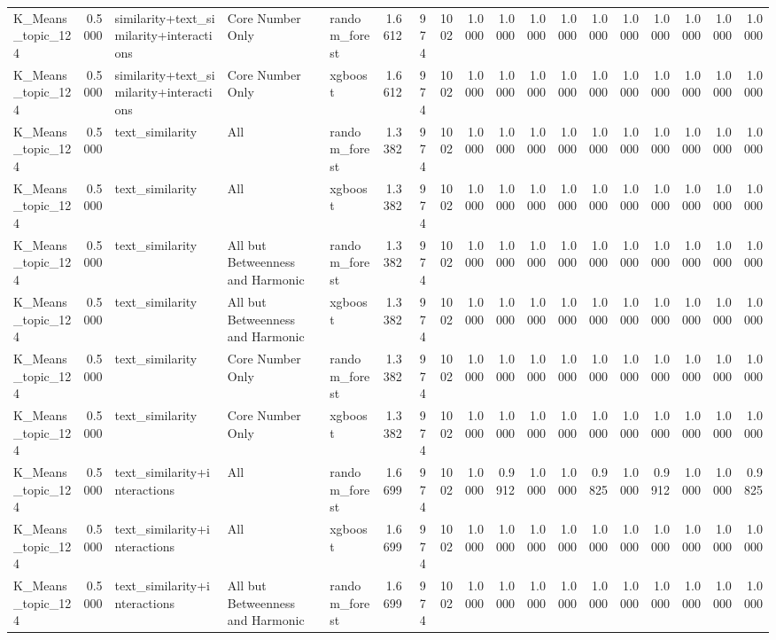 \begin{tabular}{lrlllrrrrrrrrrrrrr}
K_Means_topic_124 & 0.5000 & similarity+text_similarity+interactions & Core Number Only & random_forest & 1.6612 & 974 & 1002 & 1.0000 & 1.0000 & 1.0000 & 1.0000 & 1.0000 & 1.0000 & 1.0000 & 1.0000 & 1.0000 & 1.0000 \\
K_Means_topic_124 & 0.5000 & similarity+text_similarity+interactions & Core Number Only & xgboost & 1.6612 & 974 & 1002 & 1.0000 & 1.0000 & 1.0000 & 1.0000 & 1.0000 & 1.0000 & 1.0000 & 1.0000 & 1.0000 & 1.0000 \\
K_Means_topic_124 & 0.5000 & text_similarity & All & random_forest & 1.3382 & 974 & 1002 & 1.0000 & 1.0000 & 1.0000 & 1.0000 & 1.0000 & 1.0000 & 1.0000 & 1.0000 & 1.0000 & 1.0000 \\
K_Means_topic_124 & 0.5000 & text_similarity & All & xgboost & 1.3382 & 974 & 1002 & 1.0000 & 1.0000 & 1.0000 & 1.0000 & 1.0000 & 1.0000 & 1.0000 & 1.0000 & 1.0000 & 1.0000 \\
K_Means_topic_124 & 0.5000 & text_similarity & All but Betweenness and Harmonic & random_forest & 1.3382 & 974 & 1002 & 1.0000 & 1.0000 & 1.0000 & 1.0000 & 1.0000 & 1.0000 & 1.0000 & 1.0000 & 1.0000 & 1.0000 \\
K_Means_topic_124 & 0.5000 & text_similarity & All but Betweenness and Harmonic & xgboost & 1.3382 & 974 & 1002 & 1.0000 & 1.0000 & 1.0000 & 1.0000 & 1.0000 & 1.0000 & 1.0000 & 1.0000 & 1.0000 & 1.0000 \\
K_Means_topic_124 & 0.5000 & text_similarity & Core Number Only & random_forest & 1.3382 & 974 & 1002 & 1.0000 & 1.0000 & 1.0000 & 1.0000 & 1.0000 & 1.0000 & 1.0000 & 1.0000 & 1.0000 & 1.0000 \\
K_Means_topic_124 & 0.5000 & text_similarity & Core Number Only & xgboost & 1.3382 & 974 & 1002 & 1.0000 & 1.0000 & 1.0000 & 1.0000 & 1.0000 & 1.0000 & 1.0000 & 1.0000 & 1.0000 & 1.0000 \\
K_Means_topic_124 & 0.5000 & text_similarity+interactions & All & random_forest & 1.6699 & 974 & 1002 & 1.0000 & 0.9912 & 1.0000 & 1.0000 & 0.9825 & 1.0000 & 0.9912 & 1.0000 & 1.0000 & 0.9825 \\
K_Means_topic_124 & 0.5000 & text_similarity+interactions & All & xgboost & 1.6699 & 974 & 1002 & 1.0000 & 1.0000 & 1.0000 & 1.0000 & 1.0000 & 1.0000 & 1.0000 & 1.0000 & 1.0000 & 1.0000 \\
K_Means_topic_124 & 0.5000 & text_similarity+interactions & All but Betweenness and Harmonic & random_forest & 1.6699 & 974 & 1002 & 1.0000 & 1.0000 & 1.0000 & 1.0000 & 1.0000 & 1.0000 & 1.0000 & 1.0000 & 1.0000 & 1.0000 \\

\end{tabular}
